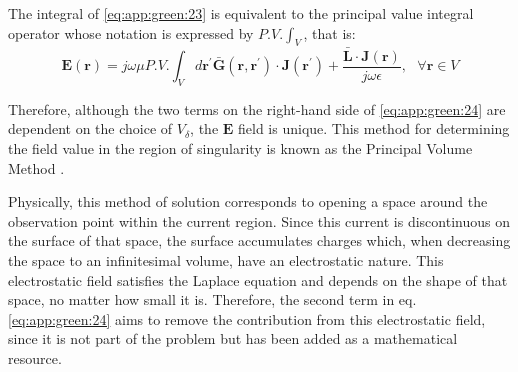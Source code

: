 			The integral of \eqref{eq:app:green:23} is equivalent to the principal value integral operator whose notation is expressed by $P.V.\int_V$, that is:
			\begin{equation}
				\mathbf{E}(\mathbf{r}) = j\omega\mu P.V.\int_V d\mathbf{r^\prime}\mathbf{\bar{G}}(\mathbf{r}, \mathbf{r^\prime})\cdot\mathbf{J}(\mathbf{r^\prime}) + \frac{\mathbf{\bar{L}}\cdot\mathbf{J}(\mathbf{r})}{j\omega\epsilon},~~~\forall\mathbf{r}\in V \label{eq:app:green:24}
			\end{equation}
			
			Therefore, although the two terms on the right-hand side of \eqref{eq:app:green:24} are dependent on the choice of $V_\delta$, the $\mathbf{E}$ field is unique. This method for determining the field value in the region of singularity is known as the Principal Volume Method \citep{vanbladel1961some}.
			
			Physically, this method of solution corresponds to opening a space around the observation point within the current region. Since this current is discontinuous on the surface of that space, the surface accumulates charges which, when decreasing the space to an infinitesimal volume, have an electrostatic nature. This electrostatic field satisfies the Laplace equation and depends on the shape of that space, no matter how small it is. Therefore, the second term in eq.\eqref{eq:app:green:24} aims to remove the contribution from this electrostatic field, since it is not part of the problem but has been added as a mathematical resource.
			
